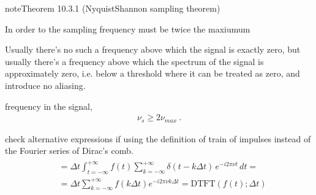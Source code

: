 \documentclass[letterpaper,10pt,english]{jupyterBook}
\begin{document}
\label{ch/complex/fourier-transforms:theorem-0}
\begin{sphinxadmonition}{note}{Theorem 10.3.1 (Nyquist\sphinxhyphen{}Shannon sampling theorem)}



\sphinxAtStartPar
In order to  the sampling frequency must be twice the maxiumum%
\begin{footnote}[1]\sphinxAtStartFootnote
Usually there’s no such a frequency above which the signal is exactly zero, but usually there’s a frequency above which the spectrum of the signal is approximately zero, i.e. below a threshold where it can be treated as zero, and introduce no aliasing.
%
\end{footnote} frequency in the signal,
\begin{equation*}
\begin{split}\nu_s \ge 2 \nu_{max} \ .\end{split}
\end{equation*}\end{sphinxadmonition}

\sphinxAtStartPar
{} check alternative expressions if using the definition of train of impulses instead of the Fourier series of Dirac’s comb.
\begin{equation}\label{equation:ch/complex/fourier-transforms:eq:dtft:2}
\begin{split}\begin{aligned}
 & = \Delta t \int_{t=-\infty}^{+\infty} f(t) \sum_{k=-\infty}^{+\infty} \delta(t - k \Delta t) \, e^{-i 2 \pi \nu t} \, dt = \\
 & = \Delta t \sum_{k=-\infty}^{+\infty} f(k \Delta t)  e^{-i 2 \pi \nu k \Delta t} = \text{DTFT}\left( f(t); \Delta t \right) 
\end{aligned}\end{split}
\end{equation}
\end{document}

